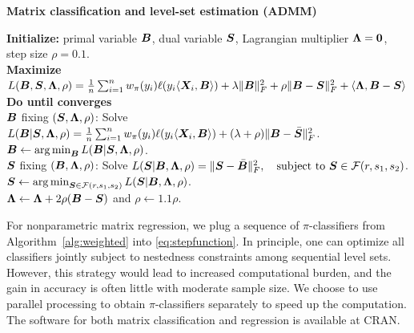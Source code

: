 \documentclass[11pt]{article}
\theoremstyle{definition}
\begin{document}
 \begin{algorithm}[h]
  \caption{{\bf Matrix classification and level-set estimation (ADMM)} } \label{alg:weighted}
{\bf Initialize:} primal variable $\bm B$, dual variable $\bm S$, Lagrangian multiplier $\bm{\Lambda}=\mathbf{0}$, step size $\rho=0.1$.\\
{\bf Maximize} $
L(\bm B,\bm S,\bm{\Lambda},\rho)={1\over n}\sum_{i=1}^nw_\pi(y_i)\ell(y_i\langle \bm X_i,\bm B \rangle) + \lambda\lVert\bm B\rVert_F^2+\rho\lVert\bm B-\bm S\rVert_F^2+\langle \bm{\Lambda}, \bm B-\bm S\rangle$\\
{\bf Do until converges}\\[.1cm]
\hspace*{.2cm}{\bf Update} $\bm B$ fixing $(\bm S,\bm{\Lambda},\rho)$: Solve $L(\bm B|\bm S,\bm{\Lambda},\rho)={1\over n}\sum_{i=1}^n w_\pi(y_i)\ell(y_i\langle\bm X_i,\bm B\rangle)+(\lambda+\rho)\lVert\bm B-\bar {\bm S}\rVert_F^2$.\\
\hspace{.2cm} $\bm B \leftarrow \operatorname*{arg\,min}_{\bm B} L(\bm B|\bm S,\bm{\Lambda},\rho)$.\\[.2cm]
\hspace*{.2cm}{\bf Update} $\bm S$ fixing $(\bm B,\bm{\Lambda},\rho)$: Solve  $ L(\bm S|\bm B,\bm{\Lambda},\rho)=\lVert\bm S-\bar {\bm B}\rVert_F^2,\quad \text{subject to }\bm S\in\mathcal{F}(r,s_1,s_2)$.\\
\hspace{.2cm} $\bm S \leftarrow  \operatorname*{arg\,min}_{\bm S\in \mathcal{F}(r,s_1,s_2)}L(\bm S|\bm B,\bm{\Lambda},\rho)$.\\[.1cm]
\hspace*{.2cm}{\bf Update} $\bm{\Lambda} \leftarrow \bm{\Lambda}+2\rho(\bm B-\bm S)$ and  $\rho\leftarrow1.1\rho$.\\[.2cm]
\end{algorithm}

For nonparametric matrix regression, we plug a sequence of $\pi$-classifiers from Algorithm~\ref{alg:weighted} into \eqref{eq:stepfunction}. In principle, one can optimize all classifiers jointly subject to nestedness constraints among sequential level sets. However, this strategy would lead to increased computational burden, and the gain in accuracy is often little with moderate sample size. We choose to use parallel processing to obtain $\pi$-classifiers separately to speed up the computation. The software for both matrix classification and regression is available at CRAN.
\end{document}
